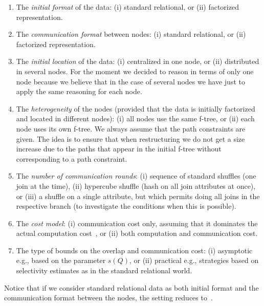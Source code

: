 \begin{enumerate}
\item The {\em initial format} of the data: (i) standard relational, or (ii) factorized representation.

\item The {\em communication format} between nodes: (i) standard relational, or (ii) factorized representation.

\item The {\em initial location} of the data: (i) centralized in one node, or (ii) distributed in several nodes.
For the moment we decided to reason in terms of only one node because we believe that in the case of several nodes we have just to apply the same reasoning for each node.

\item The {\em heterogeneity} of the nodes (provided that the data is initially factorized and located in different nodes): (i) all nodes use the same f-tree, or (ii) each node uses its own f-tree.
We always assume that the path constraints are given.
The idea is to ensure that when restructuring we do not get a size increase due to the paths that appear in the initial f-tree without corresponding to a path constraint.

\item The {\em number of communication rounds}: (i) sequence of standard shuffles (one join at the time), (ii) hypercube shuffle (hash on all join attributes at once), or (iii) a shuffle on a single attribute, but which permits doing all joins in the respective branch (to investigate the conditions when this is possible).

\item The {\em cost model}: (i) communication cost only, assuming that it dominates the actual computation cost~\cite{AfUl11}, or (ii) both computation and communication cost.

\item The type of bounds on the overlap and communication cost: (i) asymptotic e.g., based on the parameter $s(Q)$, or (ii) practical e.g., strategies based on selectivity estimates as in the standard relational world.
\end{enumerate}
Notice that if we consider standard relational data as both initial format and the communication format between the nodes, the setting reduces to~\cite{AfUl11}.


